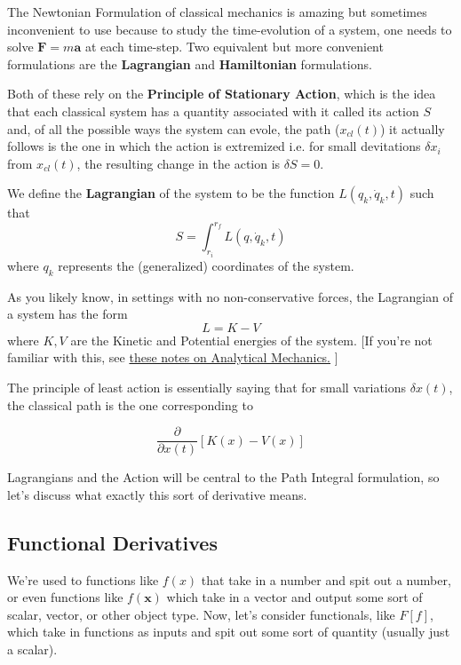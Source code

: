 \documentclass[11pt]{article}
\begin{document}
The Newtonian Formulation of classical mechanics is amazing but sometimes inconvenient to use because to study the time-evolution of a system, one needs to solve $\mathbf{F} = m\mathbf{a}$ at each time-step. Two equivalent but more convenient formulations are the \textbf{Lagrangian} and \textbf{Hamiltonian} formulations.

\vskip 0.5cm
Both of these rely on the \textbf{Principle of Stationary Action}, which is the idea that each classical system has a quantity associated with it called its action $S$ and, of all the possible ways the system can evole, the path ($x_{cl}(t)$) it actually follows is the one in which the action is extremized i.e. for small devitations $\delta x_i$ from $x_{cl}(t)$, the resulting change in the action is $\delta S = 0$.

\vskip 0.5cm
We define the \textbf{Lagrangian} of the system to be the function $L(q_k, \dot{q}_k, t)$ such that 
\[ S = \int_{r_i}^{r_f} L(q, \dot{q}_k, t) \]
where $q_k$ represents the (generalized) coordinates of the system.


\vskip 0.5cm
As you likely know, in settings with no non-conservative forces, the Lagrangian of a system has the form 
\[ L = K - V \]
where $K, V$ are the Kinetic and Potential energies of the system. [If you're not familiar with this, see \href{https://github.com/kdeoskar/notes/blob/main/Physics%20105/Notes.pdf}{these notes on Analytical Mechanics.} ]


\vskip 0.5cm
The principle of least action is essentially saying that for small variations $\delta x(t)$, the classical path is the one corresponding to 

\[ \frac{\partial}{\partial x(t)} \left[ K(x) - V(x) \right] \]

Lagrangians and the Action will be central to the Path Integral formulation, so let's discuss what exactly this sort of derivative means.

\vskip 0.5cm
\subsection{Functional Derivatives}

We're used to functions like $f(x)$ that take in a number and spit out a number, or even functions like $f(\mathbf{x})$ which take in a vector and output some sort of scalar, vector, or other object type. Now, let's consider functionals, like $F[f]$, which take in functions as inputs and spit out some sort of quantity (usually just a scalar).
\end{document}

